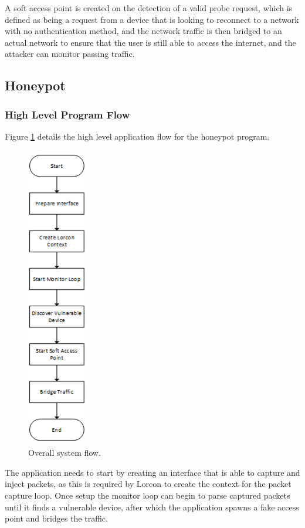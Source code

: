 A soft access point is created on the detection of a valid probe request, which is defined as being a request from a device that is looking to reconnect to a network with no authentication method, and the network traffic is then bridged to an actual network to ensure that the user is still able to access the internet, and the attacker can monitor passing traffic.

\subsection{Honeypot}
\subsubsection{High Level Program Flow}
\label{program-flow}
Figure \ref{fig:honeypot_flow} details the high level application flow for the honeypot program. 

\begin{figure}[h!]
\centering\includegraphics{design/figures/honeypot-flow.png}
\caption{Overall system flow.}
\label{fig:honeypot_flow}
\end{figure}

The application needs to start by creating an interface that is able to capture and inject packets, as this is required by Lorcon to create the context for the packet capture loop. Once setup the monitor loop can begin to parse captured packets until it finds a vulnerable device, after which the application spawns a fake access point and bridges the traffic.
\newpage
